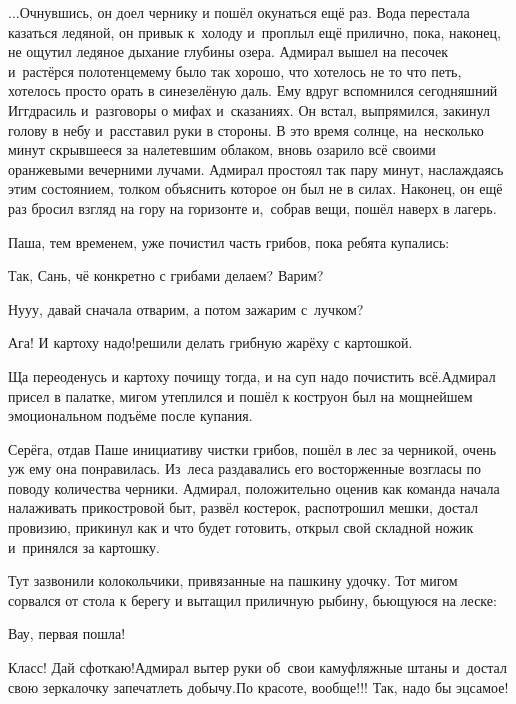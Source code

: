 \vspace{0.1cm}
$\ldots$Очнувшись, он доел чернику и пошёл окунаться ещё раз. Вода перестала казаться ледяной, он привык к~холоду и~проплыл ещё прилично, пока, наконец, не ощутил ледяное дыхание глубины озера. Адмирал вышел на песочек и~растёрся полотенцем\mdash ему было так хорошо, что хотелось не то что петь, хотелось просто орать в сине\sdash зелёную даль. Ему вдруг вспомнился сегодняшний Иггдрасиль и~разговоры о мифах и~сказаниях. Он встал, выпрямился, закинул голову в небу и~расставил руки в стороны. В это время солнце, на~несколько минут скрывшееся за налетевшим облаком, вновь озарило всё своими оранжевыми вечерними лучами. Адмирал простоял так пару минут, наслаждаясь этим состоянием, толком объяснить которое он был не в силах. Наконец, он ещё раз бросил взгляд на гору на горизонте и,~собрав вещи, пошёл наверх в лагерь.

Паша, тем временем, уже почистил часть грибов, пока ребята купались:

\diagdash Так, Сань, чё конкретно с грибами делаем? Варим?%

\diagdash Ну\sdash у\sdash у, давай сначала отварим, а потом зажарим с~лучком?

\diagdash Ага! И картоху надо!\mdash решили делать грибную жарёху с картошкой.

\diagdash Ща переоденусь и картоху почищу тогда, и на суп надо почистить всё.\mdash Адмирал присел в палатке, мигом утеплился и пошёл к костру\mdash он был на мощнейшем эмоциональном подъёме после купания.

Серёга, отдав Паше инициативу чистки грибов, пошёл в лес за черникой, очень уж ему она понравилась. Из~леса раздавались его восторженные возгласы по поводу количества черники. Адмирал, положительно оценив как команда начала налаживать прикостровой быт, развёл костерок, распотрошил мешки, достал провизию, прикинул как и что будет готовить, открыл свой складной ножик и~принялся за картошку.

Тут зазвонили колокольчики, привязанные на пашкину удочку. Тот мигом сорвался от стола к берегу и вытащил приличную рыбину, бьющуюся на леске:

\diagdash Вау, первая пошла!


\diagdash Класс! Дай сфоткаю!\mdash Адмирал вытер руки об~свои камуфляжные штаны и~достал свою зеркалочку запечатлеть добычу.\mdash По красоте, вообще!!! Так, надо бы эц\sdash самое!

